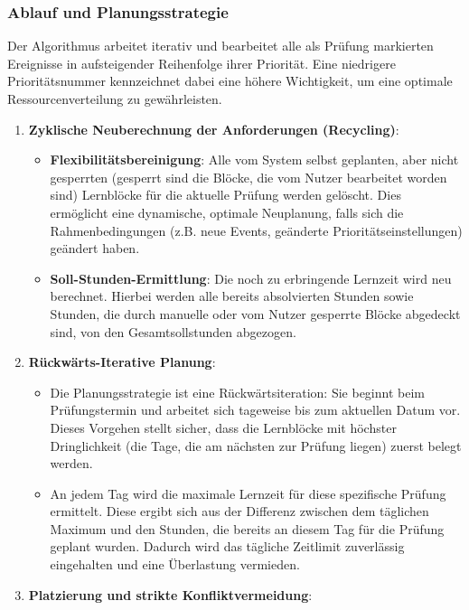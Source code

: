 \documentclass[12pt,a4paper]{report}
\begin{document}
\subsubsection{Ablauf und Planungsstrategie}
Der Algorithmus arbeitet iterativ und bearbeitet alle als Prüfung markierten Ereignisse in aufsteigender Reihenfolge ihrer Priorität. Eine niedrigere Prioritätsnummer kennzeichnet dabei eine höhere Wichtigkeit, um eine optimale Ressourcenverteilung zu gewährleisten.

\begin{enumerate}
    \item \textbf{Zyklische Neuberechnung der Anforderungen (Recycling)}:
    \begin{itemize}
        \item \textbf{Flexibilitätsbereinigung}: Alle vom System selbst geplanten, aber nicht gesperrten (gesperrt sind die Blöcke, die vom Nutzer bearbeitet worden sind) Lernblöcke für die aktuelle Prüfung werden gelöscht. Dies ermöglicht eine dynamische, optimale Neuplanung, falls sich die Rahmenbedingungen (z.B. neue Events, geänderte Prioritätseinstellungen) geändert haben.
        \item \textbf{Soll-Stunden-Ermittlung}: Die noch zu erbringende Lernzeit wird neu berechnet. Hierbei werden alle bereits absolvierten Stunden sowie Stunden, die durch manuelle oder vom Nutzer gesperrte Blöcke abgedeckt sind, von den Gesamtsollstunden abgezogen.
    \end{itemize}
    \item \textbf{Rückwärts-Iterative Planung}:
    \begin{itemize}
        \item Die Planungsstrategie ist eine Rückwärtsiteration: Sie beginnt beim Prüfungstermin und arbeitet sich tageweise bis zum aktuellen Datum vor. Dieses Vorgehen stellt sicher, dass die Lernblöcke mit höchster Dringlichkeit (die Tage, die am nächsten zur Prüfung liegen) zuerst belegt werden.
        \item An jedem Tag wird die maximale Lernzeit für diese spezifische Prüfung ermittelt. Diese ergibt sich aus der Differenz zwischen dem täglichen Maximum und den Stunden, die bereits an diesem Tag für die Prüfung geplant wurden. Dadurch wird das tägliche Zeitlimit zuverlässig eingehalten und eine Überlastung vermieden.
    \end{itemize}
    \item \textbf{Platzierung und strikte Konfliktvermeidung}:
    \begin{itemize}

\end{itemize}
\end{enumerate}
\end{document}
